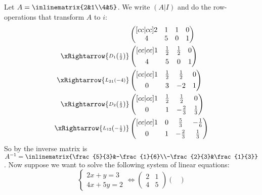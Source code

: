 \begin{exm}
	Let $A=\inlinematrix{2&1\\4&5}$. We write
	$(A|I)$ and do the row-operations that transform $A$ to $i$:
	\begin{align*}
		 & \begin{pmatrix}[cc|cc]
			2 & 1 & 1 & 0 \\
			4 & 5 & 0 & 1
		\end{pmatrix} \\
		\xRightarrow{\substack{D_1\left(\frac{1}{2}\right)}}
		 & \begin{pmatrix}[cc|cc]
			1 & \frac{1}{2} & \frac{1}{2} & 0 \\[4pt]
			4 & 5           & 0           & 1
		\end{pmatrix} \\
		\xRightarrow{\substack{L_{21}(-4)}}
		 & \begin{pmatrix}[cc|cc]
			1 & \frac{1}{2} & \frac{1}{2} & 0 \\[4pt]
			0 & 3           & -2          & 1
		\end{pmatrix} \\
		\xRightarrow{\substack{D_2\left(\frac{1}{3}\right)}}
		 & \begin{pmatrix}[cc|cc]
			1 & \frac{1}{2} & \frac{1}{2}  & 0           \\[4pt]
			0 & 1           & -\frac{2}{3} & \frac{1}{3}
		\end{pmatrix} \\
		\xRightarrow{\substack{L_{12}\left(-\frac{1}{2}\right)}}
		 & \begin{pmatrix}[cc|cc]
			1 & 0 & \frac{5}{3}  & -\frac{1}{6} \\[4pt]
			0 & 1 & -\frac{2}{3} & \frac{1}{3}
		\end{pmatrix}
	\end{align*}
	So by  the inverse matrix is
	$A^{-1}=\inlinematrix{\frac{5}{3}&-\frac{1}{6}\\-\frac{2}{3}&\frac{1}{3}}$.
	Now suppose we want to solve the following system of linear equations:
	\begin{equation*}
		\begin{cases}
			2x+y=3 \\
			4x+5y=2
		\end{cases}\Leftrightarrow
		\begin{pmatrix}
			2 & 1 \\
			4 & 5
		\end{pmatrix}\begin{pmatrix}

\end{pmatrix}
\end{equation*}
\end{exm}
